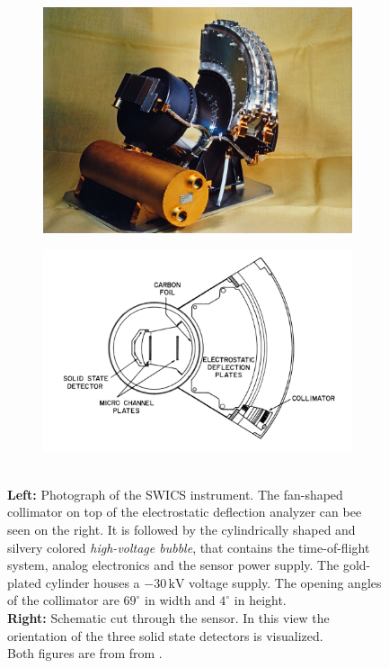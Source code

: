 \begin{figure}
	\centering
	\begin{subfigure}{.5\textwidth}
		\centering
		\includegraphics[width=0.9\linewidth]{Figures/ULYSSES-SWICS.jpg}
	\end{subfigure}%
	\begin{subfigure}{.5\textwidth}
		\centering
		\includegraphics[width=1.1\linewidth]{Figures/swics_sensor.pdf}
	\end{subfigure}
	\caption{\\ \textbf{Left:} Photograph of the SWICS instrument. The fan-shaped collimator on top of the electrostatic deflection analyzer can bee seen on the right. It is followed by the cylindrically shaped and silvery colored \textit{high-voltage bubble}, that contains the time-of-flight system, analog electronics and the sensor power supply. The gold-plated cylinder houses a $-30\,\mathrm{kV}$ voltage supply. The opening angles of the collimator are $69^\circ$ in width and $4^\circ$ in height. \\ \textbf{Right:} Schematic cut through the sensor. In this view the orientation of the three solid state detectors is visualized.\\ Both figures are from from \citet{gloeckler_1992}.}
	\label{fig:swics}
\end{figure}

